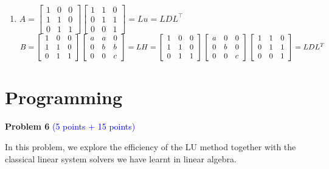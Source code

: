 \documentclass[english,onecolumn]{IEEEtran}
\begin{document}
\begin{enumerate}
    \item 
$A=\left[\begin{array}{lll}
1 & 0 & 0 \\
1 & 1 & 0 \\
0 & 1 & 1
\end{array}\right]\left[\begin{array}{lll}
1 & 1 & 0 \\
0 & 1 & 1 \\
0 & 0 & 1
\end{array}\right]=L u=L D L^{\top}$
$\\
B =\left[\begin{array}{lll}
1 & 0 & 0 \\
1 & 1 & 0 \\
0 & 1 & 1
\end{array}\right]\left[\begin{array}{lll}
a & a & 0 \\
0 & b & b \\
0 & 0 & c
\end{array}\right]=L H \\
=\left[\begin{array}{lll}
1 & 0 & 0 \\
1 & 1 & 0 \\
0 & 1 & 1
\end{array}\right]\left[\begin{array}{lll}
a & 0 & 0 \\
0 & b & 0 \\
0 & 0 & c
\end{array}\right]\left[\begin{array}{lll}
1 & 1 & 0 \\
0 & 1 & 1 \\
0 & 0 & 1
\end{array}\right]=L D L^{T}
$







\end{enumerate}

\newpage
\section{Programming}
\noindent\textbf{Problem 6}
\textcolor{blue}{(5 points + 15 points)}

\noindent In this problem, we explore  the efficiency of the LU method together with the classical linear system solvers we have learnt in linear algebra. 
\end{document}
